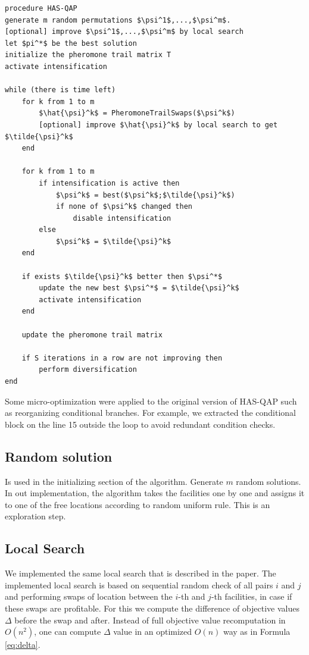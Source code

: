 \documentclass[12pt]{article}
\begin{document}
\begin{minipage}[c]{0.95\textwidth}
\begin{lstlisting}[caption={HAS-QAP pseudo-code}, label={lst:has-qap},mathescape]
procedure HAS-QAP
generate m random permutations $\psi^1$,...,$\psi^m$.
[optional] improve $\psi^1$,...,$\psi^m$ by local search
let $pi^*$ be the best solution
initialize the pheromone trail matrix T
activate intensification

while (there is time left)
	for k from 1 to m
		$\hat{\psi}^k$ = PheromoneTrailSwaps($\psi^k$)
		[optional] improve $\hat{\psi}^k$ by local search to get $\tilde{\psi}^k$
	end
	
	for k from 1 to m
		if intensification is active then
			$\psi^k$ = best($\psi^k$;$\tilde{\psi}^k$)		
			if none of $\psi^k$ changed then
				disable intensification
		else
			$\psi^k$ = $\tilde{\psi}^k$
	end
	
	if exists $\tilde{\psi}^k$ better then $\psi^*$
		update the new best $\psi^*$ = $\tilde{\psi}^k$
		activate intensification
	end
	
	update the pheromone trail matrix
	
	if S iterations in a row are not improving then
		perform diversification
end
\end{lstlisting}
\end{minipage}


Some micro-optimization were applied to the original version of HAS-QAP such as reorganizing conditional branches. For example, we extracted the conditional block on the line 15 outside the loop to avoid redundant condition checks.

\subsection{Random solution}
Is used in the initializing section of the algorithm. Generate $m$ random solutions. In out implementation, the algorithm takes the facilities one by one and assigns it to one of the free locations according to random uniform rule. This is an exploration step.

\subsection{Local Search}

We implemented the same local search that is described in the paper. The implemented local search is based on sequential random check of all pairs $i$ and $j$ and performing swaps of location between the $i$-th and $j$-th facilities, in case if these swaps are profitable. For this we compute the difference of objective values $\Delta$ before the swap and after. Instead of full objective value recomputation in $O(n^2)$, one can compute $\Delta$ value in an optimized $O(n)$ way as in Formula \ref{eq:delta}.
\end{document}
